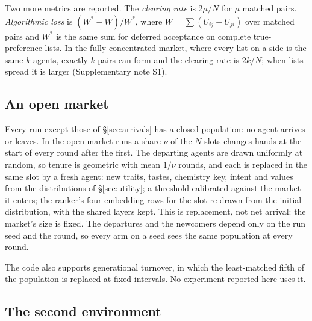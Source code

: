 Two more metrics are reported. The \emph{clearing rate} is $2 \mu / N$ for $\mu$
matched pairs. \emph{Algorithmic loss} is $(W^{*} - W)/W^{*}$, where $W = \sum
(U_{ij} + U_{ji})$ over matched pairs and $W^{*}$ is the same sum for deferred
acceptance on complete true-preference lists. In the fully concentrated market,
where every list on a side is the same $k$ agents, exactly $k$ pairs can form and
the clearing rate is $2k/N$; when lists spread it is larger (Supplementary note
S1).

\subsection{An open market}
\label{sec:open}

Every run except those of \S\ref{sec:arrivals} has a closed population: no agent
arrives or leaves. In the open-market runs a share $\nu$ of the $N$ slots changes
hands at the start of every round after the first. The departing agents are drawn
uniformly at random, so tenure is geometric with mean $1/\nu$ rounds, and each is
replaced in the same slot by a fresh agent: new traits, tastes, chemistry key,
intent and values from the distributions of \S\ref{sec:utility}; a threshold
calibrated against the market it enters; the ranker's four embedding rows for the
slot re-drawn from the initial distribution, with the shared layers kept. This is
replacement, not net arrival: the market's size is fixed. The departures and the
newcomers depend only on the run seed and the round, so every arm on a seed sees
the same population at every round.

The code also supports generational turnover, in which the least-matched fifth
of the population is replaced at fixed intervals. No experiment reported here
uses it.

\subsection{The second environment}
\label{sec:env-b}

